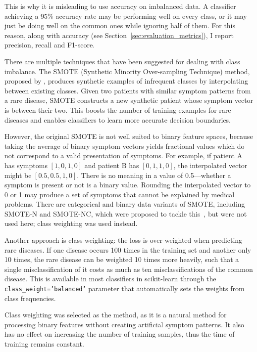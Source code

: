 This is why it is misleading to use accuracy on imbalanced data. A classifier achieving a 95\% accuracy rate may be performing well on every class, or it may just be doing well on the common ones while ignoring half of them. For this reason, along with accuracy (see Section~\ref{sec:evaluation_metrics}), I report precision, recall and F1-score.

There are multiple techniques that have been suggested for dealing with class imbalance. The SMOTE (Synthetic Minority Over-sampling Technique) method, proposed by \citet{Chawla2002}, produces synthetic examples of infrequent classes by interpolating between existing classes. Given two patients with similar symptom patterns from a rare disease, SMOTE constructs a new synthetic patient whose symptom vector is between their two. This boosts the number of training examples for rare diseases and enables classifiers to learn more accurate decision boundaries.

However, the original SMOTE is not well suited to binary feature spaces, because taking the average of binary symptom vectors yields fractional values which do not correspond to a valid presentation of symptoms. For example, if patient A has symptoms $[1, 0, 1, 0]$ and patient B has $[0, 1, 1, 0]$, the interpolated vector might be $[0.5, 0.5, 1, 0]$. There is no meaning in a value of 0.5---whether a symptom is present or not is a binary value. Rounding the interpolated vector to 0 or 1 may produce a set of symptoms that cannot be explained by medical problems. There are categorical and binary data variants of SMOTE, including SMOTE-N and SMOTE-NC, which were proposed to tackle this~\citep{Fernandez2018}, but were not used here; class weighting was used instead.

Another approach is class weighting: the loss is over-weighted when predicting rare diseases. If one disease occurs 100 times in the training set and another only 10 times, the rare disease can be weighted 10 times more heavily, such that a single misclassification of it costs as much as ten misclassifications of the common disease. This is available in most classifiers in scikit-learn through the \texttt{class\_weight='balanced'} parameter that automatically sets the weights from class frequencies.

Class weighting was selected as the method, as it is a natural method for processing binary features without creating artificial symptom patterns. It also has no effect on increasing the number of training samples, thus the time of training remains constant.

